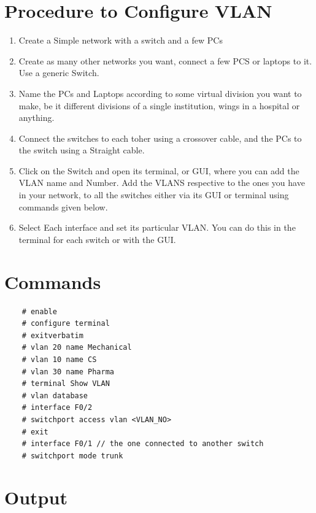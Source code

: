 \documentclass[11pt]{article}
\begin{document}
\section{Procedure to Configure VLAN}
\begin{enumerate}
	\item Create a Simple network with a switch and a few PCs
	\item Create as many other networks you want, connect a few PCS or laptops to it. Use a generic Switch.
	\item Name the PCs and Laptops according to some virtual division you want to make, be it different divisions of a single institution, wings in a hospital or anything. 
	\item Connect the switches to each toher using a crossover cable, and the PCs to the switch using a Straight cable. 
	\item Click on the Switch and open its terminal, or GUI, where you can add the VLAN name and Number. Add the VLANS respective to the ones you have in your network, to all the switches either via its GUI or terminal using commands given below. 
	\item Select Each interface and set its particular VLAN. You can do this in the terminal for each switch or with the GUI. 
\end{enumerate}

\section{Commands}
\begin{verbatim}
	# enable
	# configure terminal
	# exitverbatim
	# vlan 20 name Mechanical
	# vlan 10 name CS
	# vlan 30 name Pharma
	# terminal Show VLAN
	# vlan database
	# interface F0/2
	# switchport access vlan <VLAN_NO>
	# exit
	# interface F0/1 // the one connected to another switch
	# switchport mode trunk
\end{verbatim}

\section{Output}
\end{document}
